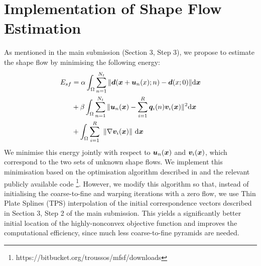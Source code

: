 


\appendix
\section{Implementation of Shape Flow Estimation}
\label{sec:cost_function}


As mentioned in the main submission (Section 3, Step 3), we propose to estimate the shape flow by minimising the following energy:
\vspace{-5pt}
\begin{align}
E_{sf} & =\alpha
\int_{\Omega}\sum_{n=1}^{N_t} \|\bm{d}(\bx+\bm{u}_n(x);n)-\bm{d}(x;0)\| \ud \bx \label{eq:costfunc}\\
    &+ \beta \int_{\Omega}\sum_{n=1}^{N_t}\|\bm{u}_n(\bx)-\sum_{i=1}^R\bm{q}_i(n)\bm{v}_i(\bx)\|^2 \ud \bx \label{eq:lowrank}\\
    &+
\int_\Omega  \sum_{i=1}^R \,\, \left \|    \nabla \bm{v}_i(\bx)    \right \|  \,\ud \bx \label{eq:TVterm}
\vspace{-5pt}
\end{align}
We minimise this energy jointly with respect to $\bm{u}_n(\boldsymbol{x})$ and $\bm{v}_i(\boldsymbol{x})$, which correspond to the
two sets of unknown shape flows.
We implement this minimisation based on the optimisation algorithm described in \cite{Garg:2013hu} and the relevant publicly available code \footnote{https://bitbucket.org/troussos/mfsf/downloads}.
However, we modify this algorithm so that, instead of initialising the coarse-to-fine and warping iterations with a zero flow, we use Thin Plate Splines (TPS) \cite{Bookstein1989} interpolation of the initial correspondence vectors described in Section 3, Step 2 of the main submission.
This yields a significantly better initial location of the highly-nonconvex objective function and improves the computational efficiency, since much less coarse-to-fine pyramids are needed.

